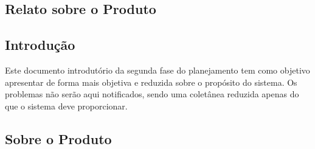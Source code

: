 \begin{apendicesenv}

\chapter{Relato sobre o Produto}


\section{Introdução}

Este documento introdutório da segunda fase do planejamento tem como objetivo apresentar de forma mais objetiva e reduzida sobre o propósito do sistema. Os problemas não serão aqui notificados, sendo uma coletânea reduzida apenas do que o sistema deve proporcionar.

\section{Sobre o Produto}


\end{apendicesenv}
